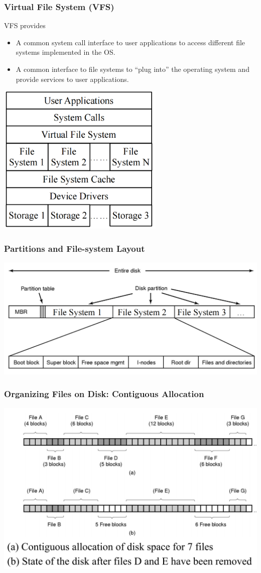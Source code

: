 \documentclass[12pt]{article}
\begin{document}
\subsubsection{Virtual File System (VFS)}
VFS provides
\begin{itemize}
    \item A common system call interface to user applications to access different file systems implemented in the OS. 
    \item A common interface to file systems to “plug into” the operating system and provide services to user applications.
\end{itemize}
\includegraphics[width=0.6\textwidth]{VFS.png}
\subsubsection{Partitions and File-system Layout}
\includegraphics[width=\textwidth]{PartitionsAndFile-systemLayout.png}
\subsubsection{Organizing Files on Disk: Contiguous Allocation}
\includegraphics[width=\textwidth]{ContiguousAllocation.png}
\end{document}
